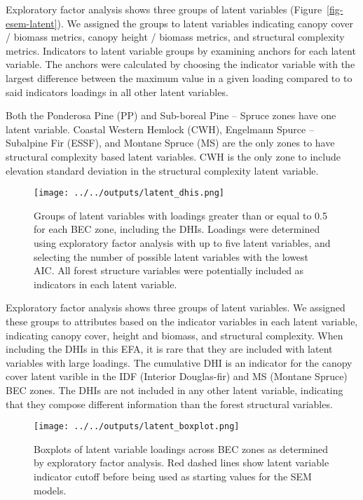 \documentclass[
  authoryear,
  review,
  3p,
  twocolumn]{elsarticle}
\begin{document}
Exploratory factor analysis shows three groups of latent variables
(Figure~\ref{fig-esem-latent}). We assigned the groups to latent
variables indicating canopy cover / biomass metrics, canopy height /
biomass metrics, and structural complexity metrics. Indicators to latent
variable groups by examining anchors for each latent variable. The
anchors were calculated by choosing the indicator variable with the
largest difference between the maximum value in a given loading compared
to to said indicators loadings in all other latent variables.

Both the Ponderosa Pine (PP) and Sub-boreal Pine -- Spruce zones have
one latent variable. Coastal Western Hemlock (CWH), Engelmann Spurce --
Subalpine Fir (ESSF), and Montane Spruce (MS) are the only zones to have
structural complexity based latent variables. CWH is the only zone to
include elevation standard deviation in the structural complexity latent
variable.

\begin{figure}

{\centering \texttt{[image: ../../outputs/latent\_dhis.png]}

}

\caption{\label{fig-esem-latent-dhi}Groups of latent variables with
loadings greater than or equal to 0.5 for each BEC zone, including the
DHIs. Loadings were determined using exploratory factor analysis with up
to five latent variables, and selecting the number of possible latent
variables with the lowest AIC. All forest structure variables were
potentially included as indicators in each latent variable.}

\end{figure}

Exploratory factor analysis shows three groups of latent variables. We
assigned these groups to attributes based on the indicator variables in
each latent variable, indicating canopy cover, height and biomass, and
structural complexity. When including the DHIs in this EFA, it is rare
that they are included with latent variables with large loadings. The
cumulative DHI is an indicator for the canopy cover latent varible in
the IDF (Interior Douglas-fir) and MS (Montane Spruce) BEC zones. The
DHIs are not included in any other latent variable, indicating that they
compose different information than the forest structural variables.

\begin{figure}

{\centering \texttt{[image: ../../outputs/latent\_boxplot.png]}

}

\caption{\label{fig-latent-boxplots}Boxplots of latent variable loadings
across BEC zones as determined by exploratory factor analysis. Red
dashed lines show latent variable indicator cutoff before being used as
starting values for the SEM models.}

\end{figure}
\end{document}
